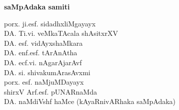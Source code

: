 \begin{center}
{\Large\bf saMpAdaka samiti}

\bigskip
\medskip

{\fontsize{14pt}{16pt}\selectfont
porx. ji.esf. sidadhxliMgayayx\\[7pt]
DA. Ti.vi. veMkaTAcala shAsitxrXV\\[7pt]
DA. esf. vidAyxshaMkara\\[7pt]
DA. enf.esf. tArAnAtha\\[7pt]
DA. ecf.vi. nAgarAjarAvf\\[7pt]
DA. si. shivakumArasAvxmi\\[7pt]
porx. esf. naMjuMDayayx\\[7pt]
shirxV Arf.esf. pUNARnaMda\\[7pt]
DA. naMdiVshf haMce (kAyaRnivARhaka saMpAdaka)}\relax
\end{center}

\vfill

\phantom{a}







